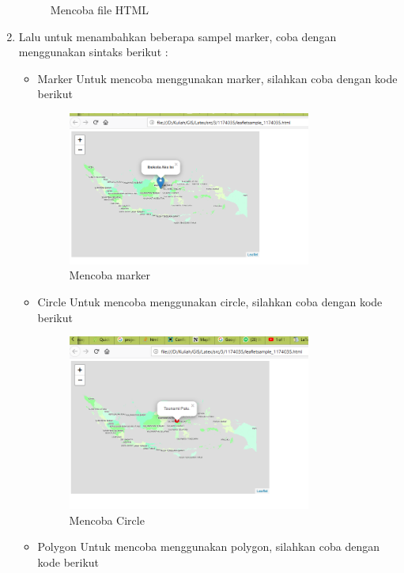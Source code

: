 \begin{enumerate}
\begin{figure}[H]
        \centering
        \caption{Mencoba file HTML}
    \end{figure}
    \item Lalu untuk menambahkan beberapa sampel marker, coba dengan menggunakan sintaks berikut : 
        \break
        \begin{itemize}
            \item Marker \break Untuk mencoba menggunakan marker, silahkan coba dengan kode berikut
            
            \hfill\break
            \begin{figure}[H]
                \includegraphics[width=8cm]{figures/1174035/tugas5/4.png}
                \centering
                \caption{Mencoba marker}
            \end{figure}
            \item Circle \break Untuk mencoba menggunakan circle, silahkan coba dengan kode berikut
            
            \hfill\break
            \begin{figure}[H]
                \includegraphics[width=8cm]{figures/1174035/tugas5/5.png}
                \centering
                \caption{Mencoba Circle}
            \end{figure}
            \item Polygon \break Untuk mencoba menggunakan polygon, silahkan coba dengan kode berikut

\end{itemize}
\end{enumerate}
